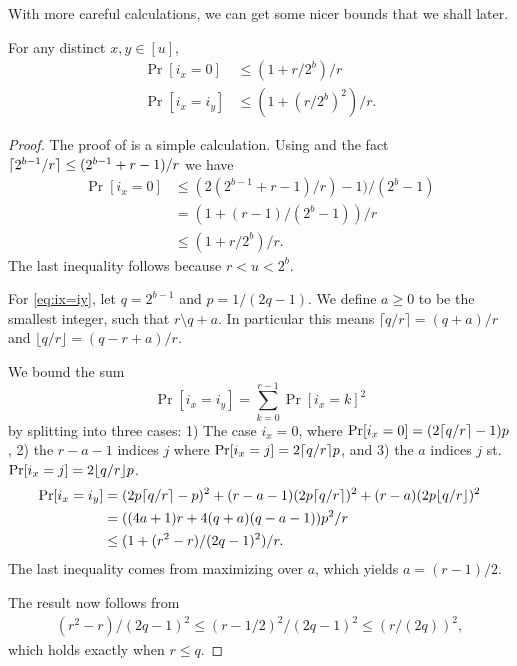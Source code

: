 With
more careful calculations, we can get some nicer bounds
that we shall later.
\begin{lemma}\label{lem:ix-r-dist} For any distinct $x,y\in [u]$, 
   \begin{align}
      \Pr[i_x=0]&\le(1+r/2^b)/r\label{eq:ix=0}\\
      \Pr[i_x=i_y]&\leq \left(1+(r/2^b)^2\right)/r.\label{eq:ix=iy}
   \end{align}
\end{lemma}
\begin{proof}
   The proof of  is a simple calculation.
   Using  and the fact $\lceil {2^{b-1}/r}\rceil\le(2^{b-1}+r-1)/r$ we have
   \begin{align*}
      \Pr[i_x=0]&\le (2(2^{b-1}+r-1)/r)-1)/(2^{b}-1)\\
                &=\left(1+(r-1)/(2^b-1)\right)/r\\
                &\le\left(1+r/2^b\right)/r.
   \end{align*}
   The last inequality follows because $r<u<2^b$.

   For \ref{eq:ix=iy},
   let $q=2^{b-1}$ and $p=1/(2q-1)$.
   We define $a\ge 0$ to be the smallest integer, such that $r\setminus q+a$.
   In particular this means 
   $\lceil q/r\rceil = (q+a)/r$ and
   $\lfloor q/r\rfloor = (q-r+a)/r$.

   We bound the sum
   $$
   \Pr[i_x=i_y]
   = \sum_{k=0}^{r-1} \Pr[i_x = k]^2
   $$
   by splitting into three cases:
   1) The case $i_x=0$, where $\Pr[i_x=0]=(2\lceil {q/r}\rceil-1)p$,
   2) the $r-a-1$ indices $j$ where $\Pr[i_x=j]=2\lceil {q/r}\rceil p$,
   and 3) the $a$ indices $j$ st. $\Pr[i_x=j]=2\lfloor {q/r} \rfloor p$.
   \begin{align*}
      \Pr[i_x=i_y]
   &=
   (2p\lceil { q/r}\rceil-p)^2 + (r-a-1) (2p \lceil q/r\rceil)^2 + (r-a) (2p \lfloor q/r \rfloor)^2
 \\&= ((4a+1)r+4(q+a)(q-a-1))p^2/r
 \\&\le (1 + (r^2-r)/(2q-1)^2) / r.
   \end{align*}
   The last inequality comes from maximizing over $a$, which yields $a=(r-1)/2$.

   The result now follows from
   \begin{align}
      (r^2-r)/(2q-1)^2
      \le
      (r-1/2)^2/(2q-1)^2
      \le
      (r/(2q))^2,
   \end{align}
   which holds exactly when $r\le q$.



\end{proof}
